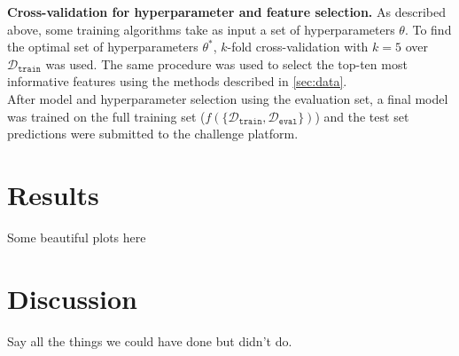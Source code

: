 \documentclass[10pt,conference,compsocconf]{IEEEtran}
\newcommand{\parabf}[1]{\vspace{1mm}\noindent\textbf{#1}}
\newcommand{\classifier}[1]{f({#1})}
\newcommand{\Deval}{\mathcal{D}_{\mathtt{eval}}}
\newcommand{\Dtrain}{\mathcal{D}_{\mathtt{train}}}
\begin{document}
\parabf{Cross-validation for hyperparameter and feature selection.} As described above, some training algorithms take as input a set of hyperparameters $\theta$. To find the optimal set of hyperparameters $\theta^*$, $k$-fold cross-validation with $k=5$ over $\Dtrain$ was used. The same procedure was used to select the top-ten most informative features using the methods described in \autoref{sec:data}.\\
  
After model and hyperparameter selection using the evaluation set, a final model was trained on the full training set ($\classifier{\{ \Dtrain, \Deval \}}$) and the test set predictions were submitted to the challenge platform. 

\section{Results}
Some beautiful plots here

\section{Discussion}
Say all the things we could have done but didn't do.



\end{document}
